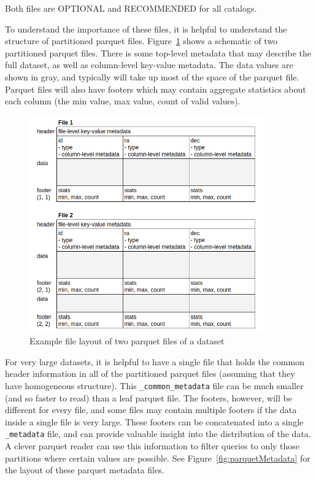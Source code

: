 \documentclass[11pt,a4paper]{ivoa}
\begin{document}
Both files are OPTIONAL and RECOMMENDED for all catalogs.

To understand the importance of these files, it is helpful to understand the structure of partitioned parquet files. 
Figure~\ref{fig:partitionedParquet} shows a schematic of two partitioned parquet files. 
There is some top-level metadata that may describe the full dataset, as well as column-level key-value metadata.
The data values are shown in gray, and typically will take up most of the space of the parquet file. 
Parquet files will also have footers which may contain aggregate statistics about each column (the min value, max value, count of valid values).

\begin{figure}
\centering
\includegraphics[width=0.9\textwidth]{leaf_files.png}
\caption{Example file layout of two parquet files of a dataset}
\label{fig:partitionedParquet}
\end{figure}

For very large datasets, it is helpful to have a single file that holds the common header information in all of the partitioned parquet files (assuming that they have homogeneous structure).
This \texttt{\_common\_metadata} file can be much smaller (and so faster to read) than a leaf parquet file.
The footers, however, will be different for every file, and some files may contain multiple footers if the data inside a single file is very large.
These footers can be concatenated into a single \texttt{\_metadata} file, and can provide valuable insight into the distribution of the data. 
A clever parquet reader can use this information to filter queries to only those partitions where certain values are possible.
See Figure~\ref{fig:parquetMetadata} for the layout of these parquet metadata files.
\end{document}
